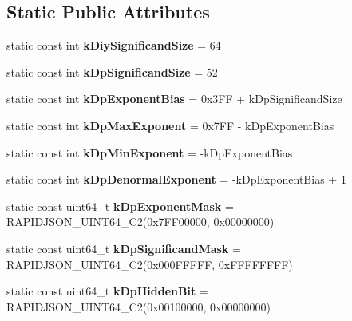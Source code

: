 \subsection*{Static Public Attributes}
\begin{DoxyCompactItemize}
\item 
\mbox{\label{structinternal_1_1DiyFp_a04f345587c1a89ae1c8d6a8091975072}} 
static const int {\bfseries k\+Diy\+Significand\+Size} = 64
\item 
\mbox{\label{structinternal_1_1DiyFp_ad39d6d90566612195625aecc5c3f5bdc}} 
static const int {\bfseries k\+Dp\+Significand\+Size} = 52
\item 
\mbox{\label{structinternal_1_1DiyFp_ae6320c488000ab79b7eea02e09de80bd}} 
static const int {\bfseries k\+Dp\+Exponent\+Bias} = 0x3\+F\+F + k\+Dp\+Significand\+Size
\item 
\mbox{\label{structinternal_1_1DiyFp_a1319a65d52de11aca8ba76e0585e62e7}} 
static const int {\bfseries k\+Dp\+Max\+Exponent} = 0x7\+F\+F -\/ k\+Dp\+Exponent\+Bias
\item 
\mbox{\label{structinternal_1_1DiyFp_a2831bc21dbe8c884d922223c726b4882}} 
static const int {\bfseries k\+Dp\+Min\+Exponent} = -\/k\+Dp\+Exponent\+Bias
\item 
\mbox{\label{structinternal_1_1DiyFp_a08ace8502dee41fc3508280df6b82fd3}} 
static const int {\bfseries k\+Dp\+Denormal\+Exponent} = -\/k\+Dp\+Exponent\+Bias + 1
\item 
\mbox{\label{structinternal_1_1DiyFp_a5b1d7c8dca16075aef43b5eb8f897bd0}} 
static const uint64\+\_\+t {\bfseries k\+Dp\+Exponent\+Mask} = R\+A\+P\+I\+D\+J\+S\+O\+N\+\_\+\+U\+I\+N\+T64\+\_\+\+C2(0x7\+F\+F00000, 0x00000000)
\item 
\mbox{\label{structinternal_1_1DiyFp_ad3a626516ab4c84eeca336a66e70dda8}} 
static const uint64\+\_\+t {\bfseries k\+Dp\+Significand\+Mask} = R\+A\+P\+I\+D\+J\+S\+O\+N\+\_\+\+U\+I\+N\+T64\+\_\+\+C2(0x000\+F\+F\+F\+F\+F, 0x\+F\+F\+F\+F\+F\+F\+F\+F)
\item 
\mbox{\label{structinternal_1_1DiyFp_ab04f9f5ca4fe81e61c1658d3317d5f94}} 
static const uint64\+\_\+t {\bfseries k\+Dp\+Hidden\+Bit} = R\+A\+P\+I\+D\+J\+S\+O\+N\+\_\+\+U\+I\+N\+T64\+\_\+\+C2(0x00100000, 0x00000000)
\end{DoxyCompactItemize}


